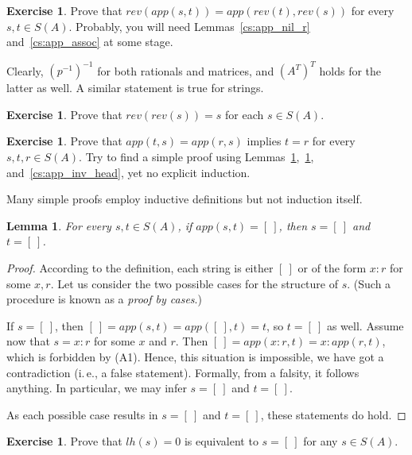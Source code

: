 \documentclass[12pt,notitlepage]{article}
\theoremstyle{plain}
\newtheorem{lemma}[thm]{Lemma}
\theoremstyle{definition}
\newtheorem{exc}[thm]{Exercise}
\theoremstyle{plain}
\newcommand{\1}{\mathbf{1}}
\newcommand{\0}{\mathbf{0}}
\begin{document}
\begin{exc}\label{cs:rev_app_distr}
Prove that $rev(app(s,t)) = app(rev(t), rev(s))$ for every $s, t \in S(A)$. Probably, you will need Lemmas~\ref{cs:app_nil_r} and~\ref{cs:app_assoc} at some stage.
\end{exc}

Clearly, $(p^{-1})^{-1}$ for both rationals and matrices, and $(A^T)^T$ holds for the latter as well. A similar statement is true for strings.
\begin{exc}\label{cs:rev_involutive}
Prove that $rev(rev(s)) = s$ for each $s \in S(A)$.
\end{exc}

\begin{exc}
Prove that $app(t,s) = app(r,s)$ implies $t = r$ for every $s, t, r \in S(A)$. Try to find a simple proof using Lemmas~\ref{cs:rev_involutive},~\ref{cs:rev_app_distr}, and~\ref{cs:app_inv_head}, yet no explicit induction.
\end{exc}

Many simple proofs employ inductive definitions but not induction itself.
\begin{lemma}\label{cs:app_eq_nil}
For every $s,t \in S(A)$, if $app(s,t) = [\ ]$, then $s = [\ ]$ and $t = [\ ]$.
\end{lemma}
\begin{proof}
According to the definition, each string is either $[\ ]$ or of the form $x : r$ for some $x, r$. Let us consider the two possible cases for the structure of $s$. (Such a procedure is known as a \emph{proof by cases}.)

If $s = [\ ]$, then $[\ ] = app(s,t) = app([\ ], t) = t$, so $t = [\ ]$ as well. Assume now that $s = x : r$ for some $x$ and $r$. Then $[\ ] = app(x:r, t) = x : app(r, t)$, which is forbidden by (A1). Hence, this situation is impossible, we have got a contradiction (i.\,e., a false statement). Formally, from a falsity, it follows anything. In particular, we may infer $s = [\ ]$ and $t = [\ ]$.

As each possible case results in $s = [\ ]$ and $t = [\ ]$, these statements do hold.
\end{proof}

\begin{exc}
Prove that $lh(s) = 0$ is equivalent to  $s = [\ ]$ for any $s \in S(A)$.
\end{exc}

\newpage
\end{document}
